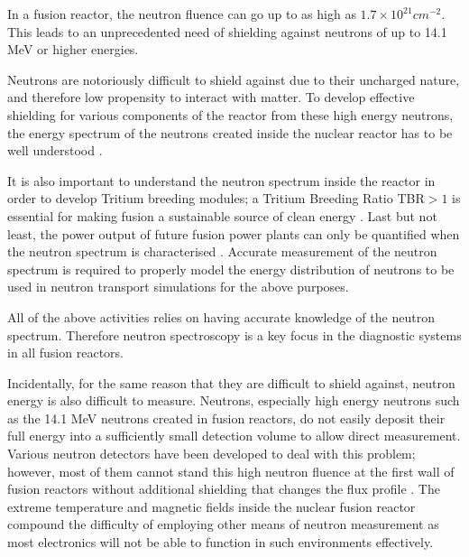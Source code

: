 \documentclass[a4paper, 12pt]{article}
\begin{document}

In a fusion reactor, the neutron fluence can go up to as high as $1.7 \times 10^{21} cm^{-2}$\cite{14MeVNNeutonYieldCalibration-JET}.
This leads to an unprecedented need of shielding against neutrons of up to 14.1 MeV or higher energies.

Neutrons are notoriously difficult to shield against due to their uncharged nature, and therefore low propensity to interact with matter\cite{Knoll2010}. To develop effective shielding for various components of the reactor from these high energy neutrons, the energy spectrum of the neutrons created inside the nuclear reactor has to be well understood \cite{TechnologicalExploitationOfDT}.

It is also important to understand the neutron spectrum inside the reactor in order to develop Tritium breeding modules; a Tritium Breeding Ratio TBR$>1$ is essential for making fusion a sustainable source of clean energy \cite{TBMD_Design}.
Last but not least, the power output of future fusion power plants can only be quantified when the neutron spectrum is characterised \cite{FusionYieldMeasurementOnJETAndTheirCalibration}.
Accurate measurement of the neutron spectrum is required to properly model the energy distribution of neutrons to be used in neutron transport simulations for the above purposes.

All of the above activities relies on having accurate knowledge of the neutron spectrum. Therefore neutron spectroscopy is a key focus in the diagnostic systems in all fusion reactors.

Incidentally, for the same reason that they are difficult to shield against, neutron energy is also difficult to measure. Neutrons, especially high energy neutrons such as the 14.1 MeV neutrons created in fusion reactors, do not easily deposit their full energy into a sufficiently small detection volume to allow direct measurement\cite{Knoll2010}. Various neutron detectors have been developed to deal with this problem;%
however, most of them cannot stand this high neutron fluence at the first wall of fusion reactors without additional shielding that changes the flux profile \cite{ScintillationDetectorResponseFunction}.
The extreme temperature and magnetic fields inside the nuclear fusion reactor compound the difficulty of employing other means of neutron measurement as most electronics will not be able to function in such environments effectively. \cite{CCDCameraDamage}
\end{document}
